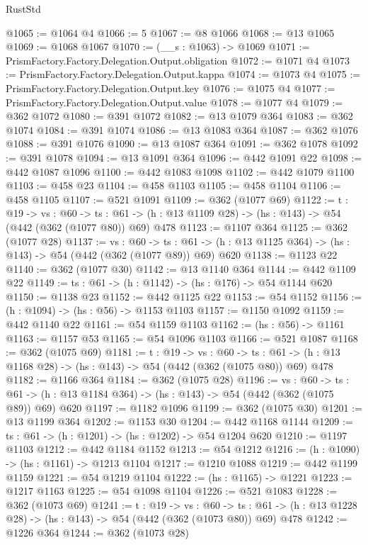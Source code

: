 \begin{lexlean}{RustStd}
\begin{coremodule}
@1065 := @1064 @4
@1066 := 5
@1067 := @8 @1066
@1068 := @13 @1065
@1069 := @1068 @1067
@1070 := (__s : @1063) -> @1069
@1071 := PrismFactory.Factory.Delegation.Output.obligation
@1072 := @1071 @4
@1073 := PrismFactory.Factory.Delegation.Output.kappa
@1074 := @1073 @4
@1075 := PrismFactory.Factory.Delegation.Output.key
@1076 := @1075 @4
@1077 := PrismFactory.Factory.Delegation.Output.value
@1078 := @1077 @4
@1079 := @362 @1072
@1080 := @391 @1072
@1082 := @13 @1079 @364
@1083 := @362 @1074
@1084 := @391 @1074
@1086 := @13 @1083 @364
@1087 := @362 @1076
@1088 := @391 @1076
@1090 := @13 @1087 @364
@1091 := @362 @1078
@1092 := @391 @1078
@1094 := @13 @1091 @364
@1096 := @442 @1091 @22
@1098 := @442 @1087 @1096
@1100 := @442 @1083 @1098
@1102 := @442 @1079 @1100
@1103 := @458 @23
@1104 := @458 @1103
@1105 := @458 @1104
@1106 := @458 @1105
@1107 := @521 @1091
@1109 := @362 (@1077 @69)
@1122 := {t : @19} ->
  {vs : @60} ->
  {ts : @61} -> (h : @13 @1109 @28) -> (hs : @143) -> @54 (@442 (@362 (@1077 @80)) @69) @478
@1123 := @1107 @364
@1125 := @362 (@1077 @28)
@1137 := {vs : @60} ->
  {ts : @61} -> (h : @13 @1125 @364) -> (hs : @143) -> @54 (@442 (@362 (@1077 @89)) @69) @620
@1138 := @1123 @22
@1140 := @362 (@1077 @30)
@1142 := @13 @1140 @364
@1144 := @442 @1109 @22
@1149 := {ts : @61} -> (h : @1142) -> (hs : @176) -> @54 @1144 @620
@1150 := @1138 @23
@1152 := @442 @1125 @22
@1153 := @54 @1152
@1156 := (h : @1094) -> (hs : @56) -> @1153 @1103
@1157 := @1150 @1092
@1159 := @442 @1140 @22
@1161 := @54 @1159 @1103
@1162 := (hs : @56) -> @1161
@1163 := @1157 @53
@1165 := @54 @1096 @1103
@1166 := @521 @1087
@1168 := @362 (@1075 @69)
@1181 := {t : @19} ->
  {vs : @60} ->
  {ts : @61} -> (h : @13 @1168 @28) -> (hs : @143) -> @54 (@442 (@362 (@1075 @80)) @69) @478
@1182 := @1166 @364
@1184 := @362 (@1075 @28)
@1196 := {vs : @60} ->
  {ts : @61} -> (h : @13 @1184 @364) -> (hs : @143) -> @54 (@442 (@362 (@1075 @89)) @69) @620
@1197 := @1182 @1096
@1199 := @362 (@1075 @30)
@1201 := @13 @1199 @364
@1202 := @1153 @30
@1204 := @442 @1168 @1144
@1209 := {ts : @61} -> (h : @1201) -> (hs : @1202) -> @54 @1204 @620
@1210 := @1197 @1103
@1212 := @442 @1184 @1152
@1213 := @54 @1212
@1216 := (h : @1090) -> (hs : @1161) -> @1213 @1104
@1217 := @1210 @1088
@1219 := @442 @1199 @1159
@1221 := @54 @1219 @1104
@1222 := (hs : @1165) -> @1221
@1223 := @1217 @1163
@1225 := @54 @1098 @1104
@1226 := @521 @1083
@1228 := @362 (@1073 @69)
@1241 := {t : @19} ->
  {vs : @60} ->
  {ts : @61} -> (h : @13 @1228 @28) -> (hs : @143) -> @54 (@442 (@362 (@1073 @80)) @69) @478
@1242 := @1226 @364
@1244 := @362 (@1073 @28)

\end{coremodule}
\end{lexlean}
